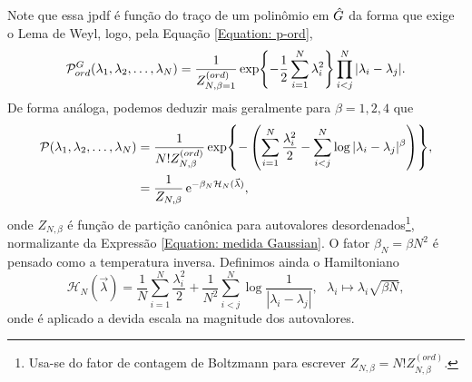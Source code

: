 Note que essa jpdf é função do traço de um polinômio em $\hat G$ da forma que exige o Lema de Weyl, logo, pela Equação \eqref{Equation: p-ord}, $$ \mathcal{P}_{ord}^{G}(\lambda_1, \lambda_2, \dots, \lambda_N) = \frac{1}{Z_{N, \beta = 1}^{(ord)}} \exp{-\frac{1}{2} \sum_{i = 1}^{N} \lambda_i^2} \prod_{i < j}^{N} |\lambda_i - \lambda_j|.$$ 
De forma análoga, podemos deduzir mais geralmente para $\beta = 1,2,4$ que
\begin{equation}
	\begin{split}
		\mathcal{P}(\lambda_1, \lambda_2, \dots, \lambda_N) 
		&= \frac{1}{ N! Z_{N, \beta}^{(ord)}} \exp{- \left(\sum_{i = 1}^{N} \frac{\lambda_i^2}{2} - \sum_{i < j}^{N} \log{|\lambda_i - \lambda_j|^{\beta}} \right)}, \\
		&= \frac{1}{Z_{N, \beta}} \operatorname{e}^{-\beta_N \mathcal{H}_N(\vec{\lambda})},
	\end{split}
\label{Equation: medida Gaussian}
\end{equation}
onde $Z_{N, \beta}$ é função de partição canônica para autovalores desordenados\footnote{Usa-se do fator de contagem de Boltzmann para escrever $ Z_{N, \beta} = N! Z_{N, \beta}^{(ord)}$.}, normalizante da Expressão \eqref{Equation: medida Gaussian}. O fator $\beta_N = \beta N^2$ é pensado como a temperatura inversa. Definimos ainda o Hamiltoniano $$\mathcal{H}_N(\vec{\lambda}) = \frac{1}{N}\sum_{i = 1}^{N} \frac{\lambda_i^2}{2} + \frac{1}{N^2} \sum_{i < j}^{N} \log{\frac{1}{|\lambda_i - \lambda_j|}}, \ \ \  \lambda_i \mapsto \lambda_i \sqrt{\beta N},$$ onde é aplicado a devida escala na magnitude dos autovalores.

